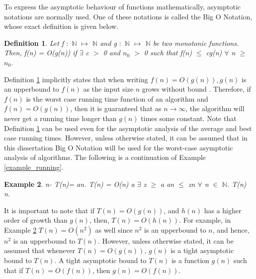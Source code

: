 \documentclass[12pt]{article}
\newtheorem{definition}{Definition}[subsection]
\newtheorem{example}[definition]{Example}
\numberwithin{equation}{subsection}
\numberwithin{table}{subsection}
\numberwithin{algorithm}{subsection}
\begin{document}
To express the asymptotic behaviour of functions mathematically, asymptotic notations are normally used. One of these notations is called the Big O Notation, whose exact definition is given below.
\begin{definition}
\label{bigonotation}
Let f $:$ $\mathbb{N}$ $\mapsto$ $\mathbb{N}$ and g $:$ $\mathbb{N}$ $\mapsto$ $\mathbb{N}$ be two monotonic functions. Then, f(n) = O(g(n)) if $\exists$ c $>$ 0 and $n_0$ $>$ 0 such that f(n) $\leq$ cg(n) $\forall$ n $\geq$ $n_0$.  
\end{definition}
Definition \ref{bigonotation} implicitly states that when writing $\mathit{f(n) = O(g(n)), g(n)}$ is an upperbound to $\mathit{f(n)}$ as the input size $\mathit{n}$ grows without bound \cite{adamchik_2009}. Therefore, if $\mathit{f(n)}$ is the worst case running time function of an algorithm and $\mathit{f(n) = O(g(n))}$, then it is guaranteed that as $\mathit{n \rightarrow \infty}$, the algorithm will never get a running time longer than $\mathit{g(n)}$ times some constant. Note that Definition \ref{bigonotation} can be used even for the asymptotic analysis of the average and best case running times. However, unless otherwise stated, it can be assumed that in this dissertation Big O Notation will be used for the worst-case asymptotic analysis of algorithms. The following is a continuation of Example \ref{example_running}.
\begin{example}
\label{bigonotationexample}
{} n-{} T(n)= an. {} T(n) = O(n) {} a  {} $\exists$ z $\geq$ a {} an $\leq$ zn $\forall$ n $\in$ $\mathbb{N}$. {} T(n) {} n.
\end{example}
It is important to note that if $\mathit{T(n) = O(g(n))}$, and $\mathit{h(n)}$ has a higher order of growth than $\mathit{g(n)}$, then, $\mathit{T(n) = O(h(n))}$. For example, in Example \ref{bigonotationexample} $\mathit{T(n) = O(n^2)}$ as well since $\mathit{n^2}$ is an upperbound to $\mathit{n}$, and hence, $n^2$ is an upperbound to $\mathit{T(n)}$. However, unless otherwise stated, it can be assumed that whenever $\mathit{T(n) = O(g(n))}$, $\mathit{g(n)}$ is a tight asymptotic bound to $\mathit{T(n)}$. A tight asymptotic bound to $\mathit{T(n)}$ is a function $\mathit{g(n)}$ such that if $\mathit{T(n)=O(f(n))}$, then $\mathit{g(n)=O(f(n))}$.\\\\
\end{document}
